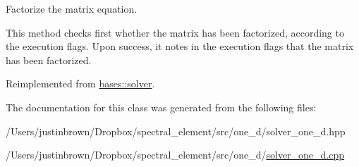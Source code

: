 Factorize the matrix equation. 



 

 This method checks first whether the matrix has been factorized, according to the execution flags. Upon success, it notes in the execution flags that the matrix has been factorized. 

Reimplemented from \hyperlink{classbases_1_1solver_adfc4b2709650924535e117405e7e3a21}{bases\-::solver}.



The documentation for this class was generated from the following files\-:\begin{DoxyCompactItemize}
\item 
/\-Users/justinbrown/\-Dropbox/spectral\-\_\-element/src/one\-\_\-d/solver\-\_\-one\-\_\-d.\-hpp\item 
/\-Users/justinbrown/\-Dropbox/spectral\-\_\-element/src/one\-\_\-d/\hyperlink{solver__one__d_8cpp}{solver\-\_\-one\-\_\-d.\-cpp}\end{DoxyCompactItemize}
